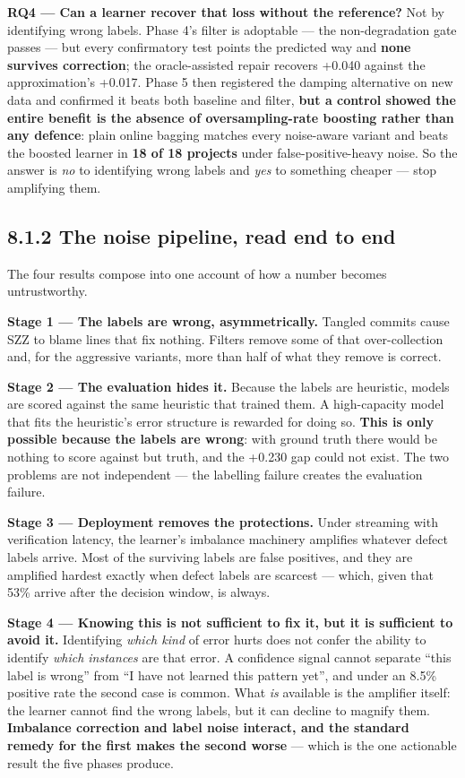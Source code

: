 \textbf{RQ4 --- Can a learner recover that loss without the reference?}
Not by identifying wrong labels. Phase 4's filter is adoptable --- the
non-degradation gate passes --- but every confirmatory test points the
predicted way and \textbf{none survives correction}; the oracle-assisted
repair recovers +0.040 against the approximation's +0.017. Phase 5 then
registered the damping alternative on new data and confirmed it beats
both baseline and filter, \textbf{but a control showed the entire
benefit is the absence of oversampling-rate boosting rather than any
defence}: plain online bagging matches every noise-aware variant and
beats the boosted learner in \textbf{18 of 18 projects} under
false-positive-heavy noise. So the answer is \emph{no} to identifying
wrong labels and \emph{yes} to something cheaper --- stop amplifying
them.

\subsection{8.1.2 The noise pipeline, read end to
end}\label{the-noise-pipeline-read-end-to-end}

The four results compose into one account of how a number becomes
untrustworthy.

\textbf{Stage 1 --- The labels are wrong, asymmetrically.} Tangled
commits cause SZZ to blame lines that fix nothing. Filters remove some
of that over-collection and, for the aggressive variants, more than half
of what they remove is correct.

\textbf{Stage 2 --- The evaluation hides it.} Because the labels are
heuristic, models are scored against the same heuristic that trained
them. A high-capacity model that fits the heuristic's error structure is
rewarded for doing so. \textbf{This is only possible because the labels
are wrong}: with ground truth there would be nothing to score against
but truth, and the +0.230 gap could not exist. The two problems are not
independent --- the labelling failure creates the evaluation failure.

\textbf{Stage 3 --- Deployment removes the protections.} Under streaming
with verification latency, the learner's imbalance machinery amplifies
whatever defect labels arrive. Most of the surviving labels are false
positives, and they are amplified hardest exactly when defect labels are
scarcest --- which, given that 53\% arrive after the decision window, is
always.

\textbf{Stage 4 --- Knowing this is not sufficient to fix it, but it is
sufficient to avoid it.} Identifying \emph{which kind} of error hurts
does not confer the ability to identify \emph{which instances} are that
error. A confidence signal cannot separate ``this label is wrong'' from
``I have not learned this pattern yet'', and under an 8.5\% positive
rate the second case is common. What \emph{is} available is the
amplifier itself: the learner cannot find the wrong labels, but it can
decline to magnify them. \textbf{Imbalance correction and label noise
interact, and the standard remedy for the first makes the second worse}
--- which is the one actionable result the five phases produce.

